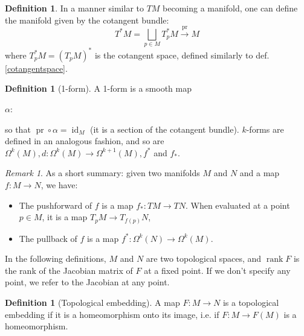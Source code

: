 \documentclass[a4paper,11pt,titlepage, article, oneside]{memoir}
\numberwithin{equation}{section}
\theoremstyle{definition}
\newtheorem{definition}[theorem]{Definition}
\theoremstyle{remark}
\newtheorem{remark}[theorem]{Remark}
\DeclareMathOperator{\id}{id}
\DeclareMathOperator{\rank}{rank}
\DeclareMathOperator{\pr}{pr}
\begin{document}
\begin{definition}
In a manner similar to $TM$ becoming a manifold, one can define the manifold given by the cotangent bundle:
\begin{equation}
T^*M = \bigsqcup_{p \in M} T_p^*M \overset{\pr}{\longrightarrow} M
\end{equation}
where $T^*_pM = (T_pM)^*$ is the cotangent space, defined similarly to def. \ref{cotangentspace}.
\end{definition}

\begin{definition}[1-form]
A 1-form is a smooth map
\begin{center}
$\alpha \colon$
\end{center}
so that $\pr \circ \alpha = \id_M$ (it is a section of the cotangent bundle). $k$-forms are defined in an analogous fashion, and so are $\Omega^k(M), d \colon \Omega^k(M) \rightarrow \Omega^{k+1}(M), f^*$ and $f_*$.
\end{definition}

\begin{remarkbox} \begin{remark}
As a short summary: given two manifolds $M$ and $N$ and a map $f \colon M \rightarrow N$, we have:
\begin{itemize}
\item The pushforward of $f$ is a map $f_* \colon TM \rightarrow TN$. When evaluated at a point $p \in M$, it is a map $T_p M \rightarrow T_{f(p)}N$,
\item The pullback of $f$ is a map $f^* \colon \Omega^k(N) \rightarrow \Omega^k(M)$.
\end{itemize}
\end{remark} \end{remarkbox}

In the following definitions, $M$ and $N$ are two topological spaces, and $\rank F$ is the rank of the Jacobian matrix of $F$ at a fixed point. If we don't specify any point, we refer to the Jacobian at any point.

\begin{definition}[Topological embedding]
A map $F\colon M \rightarrow N$ is a topological embedding if it is a homeomorphism onto its image, i.e. if $F\colon M \rightarrow F(M)$ is a homeomorphism.
\end{definition}
\end{document}
